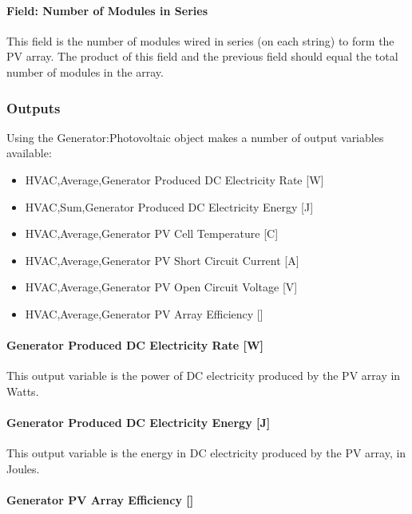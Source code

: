 \paragraph{Field: Number of Modules in Series}\label{field-number-of-modules-in-series}

This field is the number of modules wired in series (on each string) to form the PV array. The product of this field and the previous field should equal the total number of modules in the array.

\subsubsection{Outputs}\label{outputs-11-001}

Using the Generator:Photovoltaic object makes a number of output variables available:

\begin{itemize}
\item
  HVAC,Average,Generator Produced DC Electricity Rate {[}W{]}
\item
  HVAC,Sum,Generator Produced DC Electricity Energy {[}J{]}
\item
  HVAC,Average,Generator PV Cell Temperature {[}C{]}
\item
  HVAC,Average,Generator PV Short Circuit Current {[}A{]}
\item
  HVAC,Average,Generator PV Open Circuit Voltage {[}V{]}
\item
  HVAC,Average,Generator PV Array Efficiency {[]}
\end{itemize}

\paragraph{Generator Produced DC Electricity Rate {[}W{]}}\label{generator-produced-dc-electric-power-w-2}

This output variable is the power of DC electricity produced by the PV array in Watts.

\paragraph{Generator Produced DC Electricity Energy {[}J{]}}\label{generator-produced-dc-electric-energy-j}

This output variable is the energy in DC electricity produced by the PV array, in Joules.

\paragraph{Generator PV Array Efficiency {[]}}\label{generator-pv-array-efficiency}

